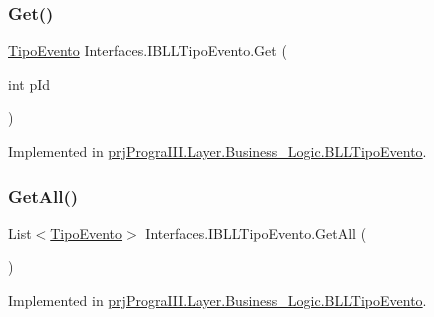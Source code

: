 \subsubsection{\texorpdfstring{Get()}{Get()}}
{\footnotesize\ttfamily \hyperlink{classprj_progra_i_i_i_1_1_layer_1_1_entities_1_1_tipo_evento}{Tipo\+Evento} Interfaces.\+I\+B\+L\+L\+Tipo\+Evento.\+Get (\begin{DoxyParamCaption}\item[{int}]{p\+Id }\end{DoxyParamCaption})}



Implemented in \hyperlink{classprj_progra_i_i_i_1_1_layer_1_1_business___logic_1_1_b_l_l_tipo_evento_ad78fc8f36ab176729080a6720f1627d5}{prj\+Progra\+I\+I\+I.\+Layer.\+Business\+\_\+\+Logic.\+B\+L\+L\+Tipo\+Evento}.

\hypertarget{interface_interfaces_1_1_i_b_l_l_tipo_evento_a9491bc76d279f88a5f33ce3a63c84302}{}\label{interface_interfaces_1_1_i_b_l_l_tipo_evento_a9491bc76d279f88a5f33ce3a63c84302} 
\subsubsection{\texorpdfstring{Get\+All()}{GetAll()}}
{\footnotesize\ttfamily List$<$\hyperlink{classprj_progra_i_i_i_1_1_layer_1_1_entities_1_1_tipo_evento}{Tipo\+Evento}$>$ Interfaces.\+I\+B\+L\+L\+Tipo\+Evento.\+Get\+All (\begin{DoxyParamCaption}{ }\end{DoxyParamCaption})}



Implemented in \hyperlink{classprj_progra_i_i_i_1_1_layer_1_1_business___logic_1_1_b_l_l_tipo_evento_a37e2d53e8cc54bfcdd0f3a89caad53cc}{prj\+Progra\+I\+I\+I.\+Layer.\+Business\+\_\+\+Logic.\+B\+L\+L\+Tipo\+Evento}.

